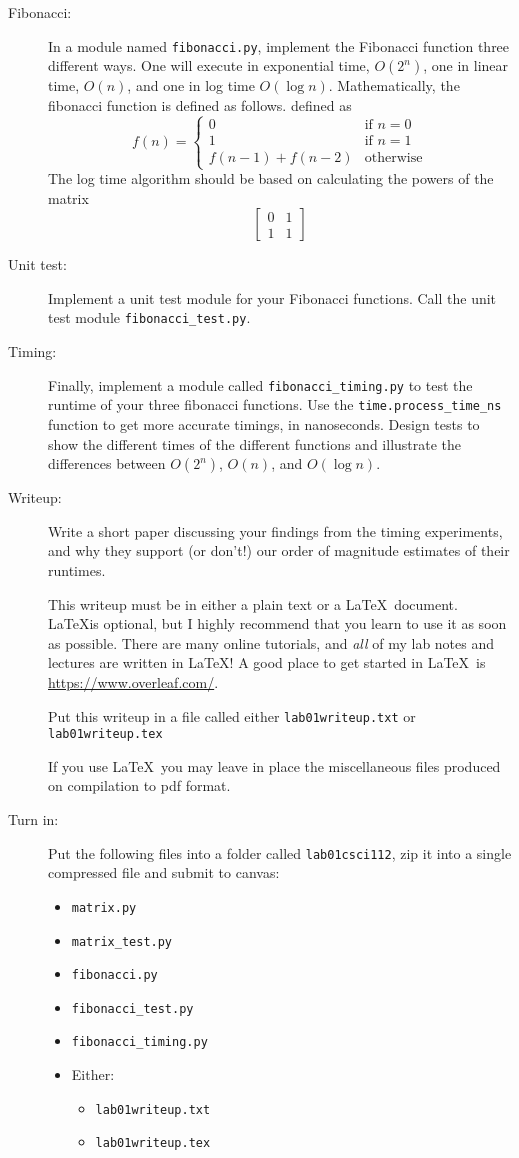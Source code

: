 \documentclass{article}
\newcommand{\bi}{\begin{itemize}}
\newcommand{\li}{\item}
\newcommand{\ei}{\end{itemize}}
\begin{document}
\begin{description}
\item[Fibonacci:]  In a module named \lstinline{fibonacci.py},
implement the Fibonacci function three different ways.  One will
execute in exponential time, $O(2^n)$, one in linear time, $O(n)$, and one in log time
$O(\log n)$.
Mathematically, the fibonacci function is defined as follows.
defined as 
\[
f(n) = \left\{\begin{array}{ll}
     0 & \mbox{if } n = 0\\
       1 & \mbox{if } n = 1\\
       f(n-1) + f(n-2) & \mbox{otherwise}\end{array}\right.
 \]
 The log time algorithm should be based on calculating
 the powers of the matrix
 \[
 \left[\begin{array}{cc}0 & 1 \\ 1 & 1 \end{array}\right]
 \]
 
 \item[Unit test:] Implement a unit test module for your
 Fibonacci functions.  Call the unit test module \lstinline{fibonacci_test.py}.
 
 \item[Timing:] Finally, implement a module called \lstinline{fibonacci_timing.py}
 to test the runtime
 of your three fibonacci functions.  Use the \lstinline{time.process_time_ns}
 function to get more accurate timings, in nanoseconds.  Design
 tests to show the different times of the different functions and illustrate
 the differences between $O(2^n)$, $O(n)$, and $O(\log n)$.
 
 \item[Writeup:]  Write a short paper discussing your findings from the
 timing experiments, and why they support (or don't!) our order of
 magnitude estimates of their runtimes. 
 
 This writeup must be in either a plain text or a \LaTeX\ document.
 \LaTeX is optional, but I highly recommend that you learn to use
 it as soon as possible.  There are many online tutorials, and {\em all}
 of my lab notes and lectures are written in \LaTeX!  A good place to
 get started in \LaTeX\ is \url{https://www.overleaf.com/}.
 
 Put this writeup in a file
 called either {\tt lab01writeup.txt}
 or  {\tt lab01writeup.tex}
 
 If you use \LaTeX\ you may leave in place the miscellaneous
 files produced on compilation to pdf format. 
 
 \item[Turn in:] Put the following files into a folder called {\tt lab01csci112},
 zip it into a single compressed file and submit to canvas:

\bi
\li \lstinline{matrix.py}
\li \lstinline{matrix_test.py}
\li \lstinline{fibonacci.py}
\li \lstinline{fibonacci_test.py}
\li \lstinline{fibonacci_timing.py}
\li Either:
\bi
\li \lstinline{lab01writeup.txt}
\li \lstinline{lab01writeup.tex}
\ei
\ei
 


\end{description}
\end{document}
